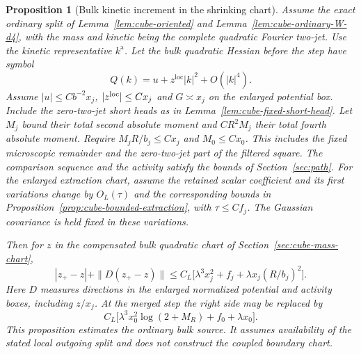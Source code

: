\documentclass[11pt]{article}
\newtheorem{proposition}[theorem]{Proposition}
\theoremstyle{definition}
\begin{document}
\begin{proposition}[Bulk kinetic increment in the shrinking chart]
\label{prop:bulk-kinetic-source}
Assume the exact ordinary split of
Lemma~\ref{lem:cube-oriented} and
Lemma~\ref{lem:cube-ordinary-W-d4}, with the mass and kinetic being
the complete quadratic Fourier two-jet. Use the kinetic
representative \(k^{\mathrm a}\). Let the bulk quadratic Hessian
before the step have symbol
\begin{equation}
 Q(k)=u+z^{\mathrm{loc}}|k|^2+O(|k|^4).
\end{equation}
Assume \(|u|\le C b^{-2}x_j\), \(|z^{\rm loc}|\le Cx_j\) and
\(G\asymp x_j\) on the enlarged potential box. Include the
zero-two-jet short heads as in Lemma~\ref{lem:cube-fixed-short-head}.
Let \(M_j\) bound their total second absolute moment
and \(C R^2 M_j\) their total fourth absolute moment.
Require \(M_j R/b_j\le C x_j\) and \(M_0\le C x_0\).
This includes the fixed microscopic remainder and the
zero-two-jet part of the filtered square. The comparison sequence
and the activity satisfy the bounds of Section~\ref{sec:path}.
For the enlarged extraction chart, assume the retained
scalar coefficient and its first variations change by
\(O_L(\tau)\) and the corresponding bounds in
Proposition~\ref{prop:cube-bounded-extraction}, with
\(\tau\le C f_j\). The Gaussian covariance is held fixed in
these variations.

Then for \(z\) in the compensated bulk quadratic chart of
Section~\ref{sec:cube-mass-chart},
\begin{equation}
 |z_+-z|+\|D(z_+-z)\|
  \le C_L\bigl[\lambda^3x_j^2+f_j
                     +\lambda x_j(R/b_j)^2\bigr].
\end{equation}
Here \(D\) measures directions in the enlarged normalized
potential and activity boxes, including \(z/x_j\). At the
merged step the right side may be replaced by
\begin{equation}
 C_L\bigl[\lambda^3x_0^2\log(2+M_R)+f_0+\lambda x_0\bigr].
\end{equation}
This proposition estimates the ordinary bulk source. It
assumes availability of the stated local outgoing split and
does not construct the coupled boundary chart.
\end{proposition}
\end{document}
